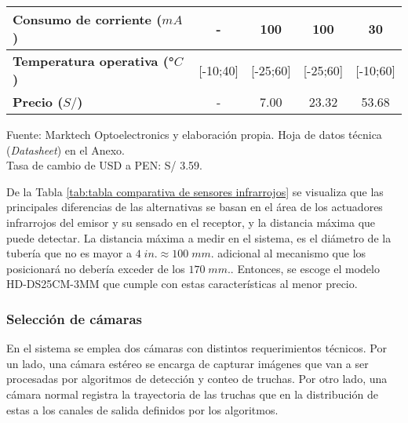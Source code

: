 \begin{mytable}[H]
\begin{tabular}{l|c|c|c|c|}
{			\begin{minipage}{\myforthmaxsizeofcontenttable}	
				\textbf{Consumo de corriente ($mA$)}
			\end{minipage}
		} & -  & 100 & 100 & 30         \\ \hline
		\multicolumn{1}{|l|}{
			\begin{minipage}{\myforthmaxsizeofcontenttable}	
				\textbf{Temperatura operativa (°$C$)}
			\end{minipage}
		} & [-10;40] & [-25;60] & [-25;60] & [-10;60] \\ \hline
		\multicolumn{1}{|l|}{
			\begin{minipage}{\myforthmaxsizeofcontenttable}	
				\textbf{Precio ($S/$)}
			\end{minipage}
		} & - & 7.00 & 23.32 & 53.68 \\ \hline
	\end{tabular}
	\begin{myflushcenteraftertable}	
		Fuente: Marktech Optoelectronics y elaboración propia. Hoja de datos técnica (\textit{Datasheet}) en el Anexo.\\
		Tasa de cambio de USD a PEN: S/ 3.59.
	\end{myflushcenteraftertable}
\end{mytable}

De la Tabla \ref{tab:tabla comparativa de sensores infrarrojos} se visualiza que las principales diferencias de las alternativas se basan en el área de los actuadores infrarrojos del emisor y su sensado en el receptor, y la distancia máxima que puede detectar. La distancia máxima a medir en el sistema, es el diámetro de la tubería que no es mayor a $4 \; in. \approx 100 \; mm.$ adicional al mecanismo que los posicionará no debería exceder de los $170 \; mm.$. Entonces, se escoge el modelo HD-DS25CM-3MM que cumple con estas características al menor precio.

\subsubsection{Selección de cámaras} 

En el sistema se emplea dos cámaras con distintos requerimientos técnicos. Por un lado, una cámara estéreo se encarga de capturar imágenes que van a ser procesadas por algoritmos de detección y conteo de truchas. Por otro lado, una cámara normal registra la trayectoria de las truchas que en la distribución de estas a los canales de salida definidos por los algoritmos. 

